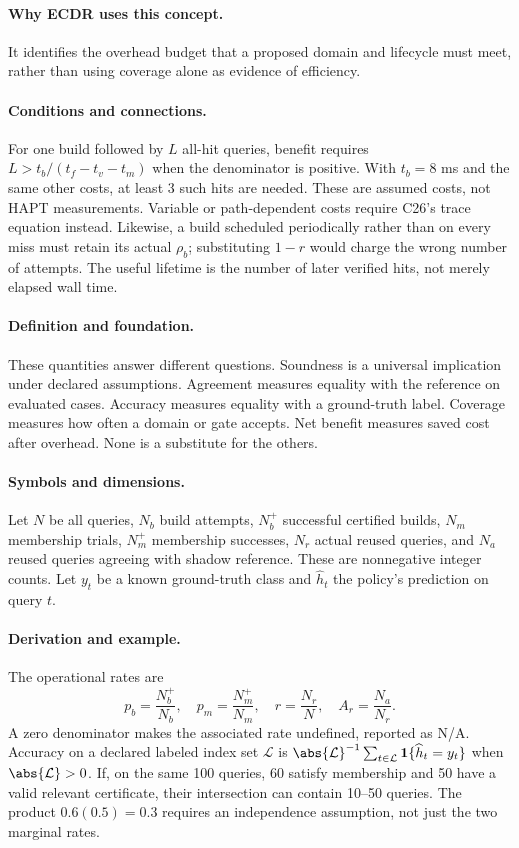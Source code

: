 \paragraph{Why ECDR uses this concept.}
It identifies the overhead budget that a proposed domain and lifecycle must meet, rather than using coverage alone as evidence of efficiency.
\paragraph{Conditions and connections.}
For one build followed by $L$ all-hit queries, benefit requires $L>t_b/(t_f-t_v-t_m)$ when the denominator is positive. With $t_b=8$ ms and the same other costs, at least 3 such hits are needed. These are assumed costs, not HAPT measurements. Variable or path-dependent costs require C26's trace equation instead. Likewise, a build scheduled periodically rather than on every miss must retain its actual $\rho_b$; substituting $1-r$ would charge the wrong number of attempts. The useful lifetime is the number of later verified hits, not merely elapsed wall time.

\paragraph{Definition and foundation.}
These quantities answer different questions. Soundness is a universal implication under declared assumptions. Agreement measures equality with the reference on evaluated cases. Accuracy measures equality with a ground-truth label. Coverage measures how often a domain or gate accepts. Net benefit measures saved cost after overhead. None is a substitute for the others.
\paragraph{Symbols and dimensions.}
Let $N$ be all queries, $N_b$ build attempts, $N_b^+$ successful certified builds, $N_m$ membership trials, $N_m^+$ membership successes, $N_r$ actual reused queries, and $N_a$ reused queries agreeing with shadow reference. These are nonnegative integer counts. Let $y_t$ be a known ground-truth class and $\widehat h_t$ the policy's prediction on query $t$.
\paragraph{Derivation and example.}
The operational rates are
\[
 p_b=\frac{N_b^+}{N_b},\quad p_m=\frac{N_m^+}{N_m},\quad
 r=\frac{N_r}{N},\quad A_r=\frac{N_a}{N_r}.
\]
A zero denominator makes the associated rate undefined, reported as N/A. Accuracy on a declared labeled index set $\mathcal L$ is $\abs{\mathcal L}^{-1}\sum_{t\in\mathcal L}\mathbf1\{\widehat h_t=y_t\}$ when $\abs{\mathcal L}>0$.
If, on the same 100 queries, 60 satisfy membership and 50 have a valid relevant certificate, their intersection can contain 10--50 queries. The product $0.6(0.5)=0.3$ requires an independence assumption, not just the two marginal rates.
